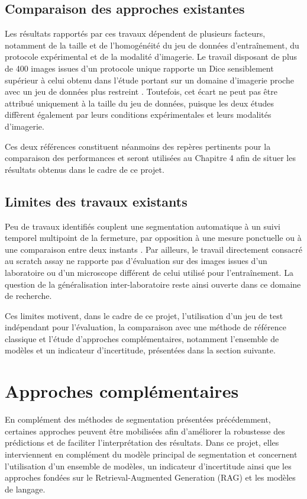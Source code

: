 \documentclass[12pt,a4paper]{report}
\begin{document}
\subsection{Comparaison des approches existantes}

Les résultats rapportés par ces travaux dépendent de plusieurs facteurs, notamment de la taille et de l'homogénéité du jeu de données d'entraînement, du protocole expérimental et de la modalité d'imagerie. Le travail disposant de plus de 400 images issues d'un protocole unique \cite{ref2} rapporte un Dice sensiblement supérieur à celui obtenu dans l'étude portant sur un domaine d'imagerie proche avec un jeu de données plus restreint \cite{ref3}. Toutefois, cet écart ne peut pas être attribué uniquement à la taille du jeu de données, puisque les deux études diffèrent également par leurs conditions expérimentales et leurs modalités d'imagerie.

Ces deux références constituent néanmoins des repères pertinents pour la comparaison des performances et seront utilisées au Chapitre 4 afin de situer les résultats obtenus dans le cadre de ce projet.

\subsection{Limites des travaux existants}

Peu de travaux identifiés couplent une segmentation automatique à un suivi temporel multipoint de la fermeture, par opposition à une mesure ponctuelle ou à une comparaison entre deux instants \cite{ref11,ref12}. Par ailleurs, le travail directement consacré au scratch assay \cite{ref2} ne rapporte pas d'évaluation sur des images issues d'un laboratoire ou d'un microscope différent de celui utilisé pour l'entraînement. La question de la généralisation inter-laboratoire reste ainsi ouverte dans ce domaine de recherche.

Ces limites motivent, dans le cadre de ce projet, l'utilisation d'un jeu de test indépendant pour l'évaluation, la comparaison avec une méthode de référence classique et l'étude d'approches complémentaires, notamment l'ensemble de modèles et un indicateur d'incertitude, présentées dans la section suivante.

\section{Approches complémentaires}
\label{sec:rag}

En complément des méthodes de segmentation présentées précédemment, certaines approches peuvent être mobilisées afin d'améliorer la robustesse des prédictions et de faciliter l'interprétation des résultats. Dans ce projet, elles interviennent en complément du modèle principal de segmentation et concernent l'utilisation d'un ensemble de modèles, un indicateur d'incertitude ainsi que les approches fondées sur le Retrieval-Augmented Generation (RAG) et les modèles de langage.
\end{document}
